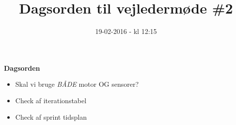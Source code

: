 \documentclass{article}
\title{Dagsorden til vejledermøde \#2}
\date{19-02-2016 - kl 12:15}
\begin{document}
	\maketitle
	\textbf{Dagsorden}
	
	\begin{itemize}
		\item Skal vi bruge \textit{BÅDE} motor OG sensorer?
		\item Check af iterationstabel
		\item Check af sprint tidsplan
	\end{itemize}
\end{document}
